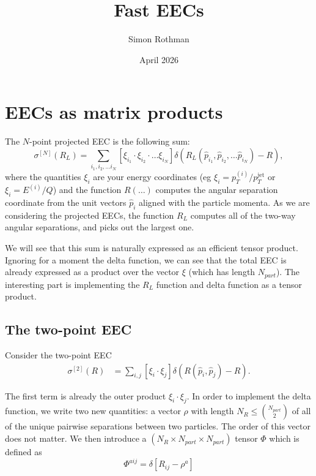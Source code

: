 \documentclass{article}
\title{Fast EECs}
\author{Simon Rothman}
\date{April 2026}
\begin{document}
\maketitle

\section{EECs as matrix products}

The $N$-point projected EEC is the following sum:
\begin{equation}
    \sigma^{[N]}(R_L) = \sum_{i_1, i_2, \ldots i_N} \left[ \xi_{i_1}\cdot \xi_{i_2}\cdot \ldots \xi_{i_N} \right] \delta( R_L(\hat{p}_{i_1}, \hat{p}_{i_2}, \ldots \hat{p}_{i_N}) - R),
    \label{eqn:generalEEC}
\end{equation}
where the quantities $\xi_i$ are your energy coordinates (eg $\xi_i = p_T^{(i)}/p_T^{\text{jet}}$ or $\xi_i = E^{(i)}/Q$) and the function $R(\ldots)$ computes the angular separation coordinate from the unit vectors $\hat{p}_i$ aligned with the particle momenta. As we are considering the projected EECs, the function $R_L$ computes all of the two-way angular separations, and picks out the largest one. 

We will see that this sum is naturally expressed as an efficient tensor product. Ignoring for a moment the delta function, we can see that the total EEC is already expressed as a product over the vector $\xi$ (which has length $N_{part}$). The interesting part is implementing the $R_L$ function and delta function as a tensor product. 

\subsection{The two-point EEC}

Consider the two-point EEC
\begin{align}
    \sigma^{[2]}(R) &= \sum_{i, j} \left[ \xi_{i}\cdot \xi_{j}\right] \delta( R(\hat{p}_{i}, \hat{p}_{j}) - R).
\end{align}

The first term is already the outer product $\xi_{i}\cdot \xi_{j}$. In order to implement the delta function, we write two new quantities: a vector $\rho$ with length $N_R \leq {N_{part} \choose 2}$ of all of the unique pairwise separations between two particles. The order of this vector does not matter. We then introduce a $(N_{R} \times N_{part} \times N_{part})$ tensor $\Phi$ which is defined as 
\begin{equation}
    \Phi^{a ij} = \delta\left[R_{ij} - \rho^a\right]
\end{equation}
\end{document}
